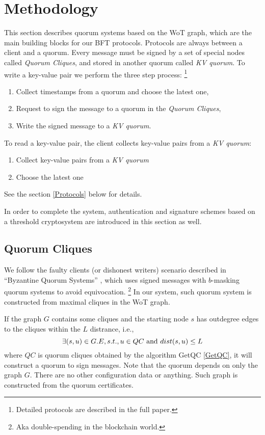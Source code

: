 \section{Methodology}
This section describes quorum systems based on the WoT graph, which
are the main building blocks for our BFT protocols. Protocols are
always between a client and a quorum. Every message must be signed by
a set of special nodes called {\em Quorum Cliques}, and stored in
another quorum called {\em KV quorum}. To write a key-value pair we
perform the three step process:
\ifdefined\ABSTRACT
\footnote{Detailed protocols are described in the full paper.}
\fi
\begin{enumerate}
\item Collect timestamps from a quorum and choose the latest one,
\item Request to sign the message to a quorum in the {\em Quorum Cliques},
\item Write the signed message to a {\em KV quorum}.
\end{enumerate}
To read a key-value pair, the client collects key-value pairs from 
a {\em KV quorum}:
\begin{enumerate}
\item Collect key-value pairs from a {\em KV quorum}
\item Choose the latest one
\end{enumerate}
\ifdefined\ABSTRACT
\else
See the section \ref{Protocols} below for details.
\fi

In order to complete the system, authentication and signature schemes
based on a threshold cryptosystem are introduced in this section as
well.

\subsection{Quorum Cliques}
We follow the faulty clients (or dishonest writers) scenario described
in ``Byzantine Quorum Systems'' \cite{Delhi:1,Delhi:2}, which uses
signed messages with $b$-masking quorum systems to avoid equivocation.
\footnote{Aka double-spending in the blockchain world.}
In our system, such quorum system is constructed from maximal cliques
in the WoT graph.

If the graph $G$ contains some cliques and the starting node $s$ has
outdegree edges to the cliques within the $L$ distrance, i.e.,
\[
\exists (s, u) \in G.E, s.t., u \in QC \text{ and } dist(s, u) \le L \\
\]
where $QC$ is quorum cliques obtained by the algorithm {\sf GetQC}
\ref{GetQC},
it will construct a quorum to sign messages. Note that the quorum
depends on only the graph $G$. There are no other configuration data
or anything.
Such graph is constructed from the quorum certificates. 

